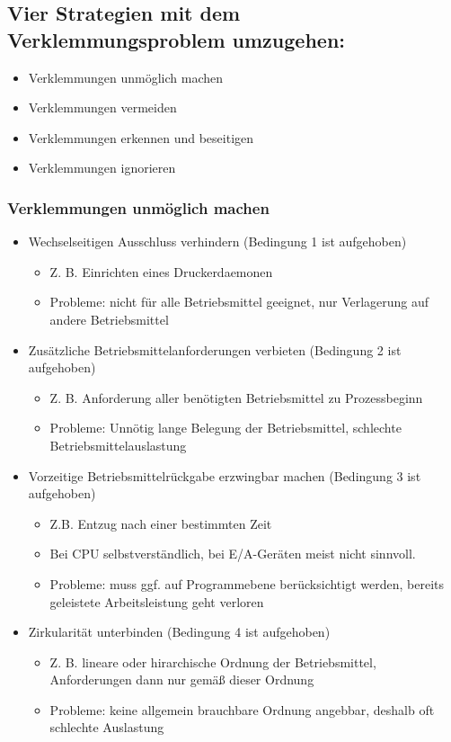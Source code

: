 \documentclass[11pt]{article}
\begin{document}
\subsection*{Vier Strategien mit dem Verklemmungsproblem umzugehen:}
\label{sec:org359aad9}
\begin{itemize}
\item Verklemmungen unmöglich machen
\item Verklemmungen vermeiden
\item Verklemmungen erkennen und beseitigen
\item Verklemmungen ignorieren
\end{itemize}
\subsubsection*{Verklemmungen unmöglich machen}
\label{sec:org97f75e2}
\begin{itemize}
\item Wechselseitigen Ausschluss verhindern (Bedingung 1 ist aufgehoben)
\begin{itemize}
\item Z. B. Einrichten eines Druckerdaemonen
\item Probleme: nicht für alle Betriebsmittel geeignet, nur Verlagerung
auf andere Betriebsmittel
\end{itemize}
\item Zusätzliche Betriebsmittelanforderungen verbieten (Bedingung 2 ist
aufgehoben)
\begin{itemize}
\item Z. B. Anforderung aller benötigten Betriebsmittel zu Prozessbeginn
\item Probleme: Unnötig lange Belegung der Betriebsmittel, schlechte
Betriebsmittelauslastung
\end{itemize}
\end{itemize}
\begin{itemize}
\item Vorzeitige Betriebsmittelrückgabe erzwingbar machen (Bedingung 3 ist
aufgehoben)
\begin{itemize}
\item Z.B. Entzug nach einer bestimmten Zeit
\item Bei CPU selbstverständlich, bei E/A-Geräten meist nicht sinnvoll.
\item Probleme: muss ggf. auf Programmebene berücksichtigt werden,
bereits geleistete Arbeitsleistung geht verloren
\end{itemize}
\item Zirkularität unterbinden (Bedingung 4 ist aufgehoben)
\begin{itemize}
\item Z. B. lineare oder hirarchische Ordnung der Betriebsmittel,
Anforderungen dann nur gemäß dieser Ordnung
\item Probleme: keine allgemein brauchbare Ordnung angebbar, deshalb oft
schlechte Auslastung
\end{itemize}
\end{itemize}
\end{document}
